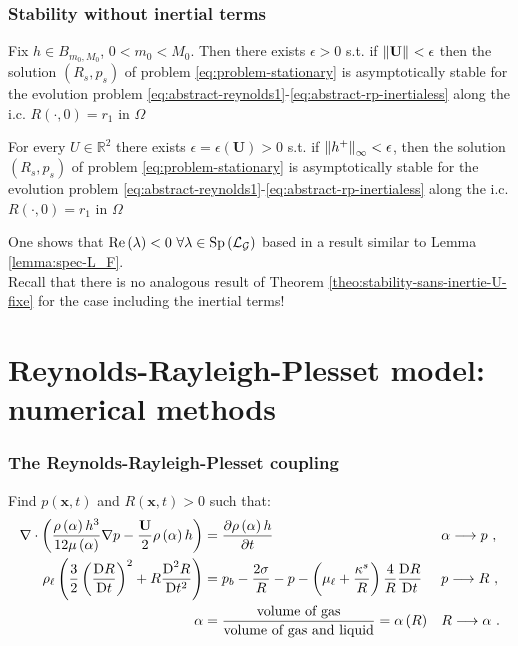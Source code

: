 \documentclass[10pt,aspectratio=169]{beamer}
\begin{document}
\begin{frame}\frametitle{Stability without inertial terms}
\begin{theorem} \label{theo:stability-sans-inertie-h-fix}
	Fix $h\in B_{m_0,M_0}$, $0<m_0<M_0$. Then there exists $\epsilon>0$ s.t. if $\left\lVert\mathbf{U}\right\rVert_{}<\epsilon$ then the solution $\left(R_s,p_s\right)$ of problem \eqref{eq:problem-stationary} is asymptotically stable for the evolution problem \eqref{eq:abstract-reynolds1}-\eqref{eq:abstract-rp-inertialess} along the i.c. $R\left(\cdot,0\right)=r_1$ in $\Omega$
\end{theorem}
\begin{theorem}\label{theo:stability-sans-inertie-U-fixe} For every $U\in \mathbb{R}^2$ there exists $\epsilon=\epsilon\left(\mathbf{U}\right)>0$ s.t. if $\left\lVert h^+\right\rVert_{\infty}<\epsilon$, then the solution $\left(R_s,p_s\right)$ of problem \eqref{eq:problem-stationary} is asymptotically stable for the evolution problem \eqref{eq:abstract-reynolds1}-\eqref{eq:abstract-rp-inertialess} along the i.c. $R\left(\cdot,0\right)=r_1$ in $\Omega$
\end{theorem}\bigskip

One shows that $\mbox{Re}\left(\lambda\right)<0~\forall \lambda\in \textnormal{Sp}\left(\mathcal{L}_\mathcal{G}\right)$ based in a result similar to Lemma \ref{lemma:spec-L_F}.\\
\bigskip
Recall that there is no analogous result of Theorem \ref{theo:stability-sans-inertie-U-fixe} for the case including the inertial terms!
\end{frame}

\setcounter{showSlideNumbers}{0}
\section{Reynolds-Rayleigh-Plesset model: numerical methods}
\setcounter{showSlideNumbers}{1}

\begin{frame}
\frametitle{The Reynolds-Rayleigh-Plesset coupling}

Find $p(\mathbf{x},t)$ and $R(\mathbf{x},t)>0$ such that:
\begin{align*}
\nabla\cdot\left(\frac{\rho\left(\alpha\right) h^3}{12\mu\left(\alpha\right) }\nabla p-\frac{\mathbf{U}}{2}\rho\left(\alpha\right) h \right)&=\frac{\partial \rho\left(\alpha\right) h}{\partial t}&&\alpha \longrightarrow p~,\\
\rho_\ell\left(\frac{3}{2}\left(\frac{\mbox{D} R}{\mbox{D} t}\right)^2+R\frac{\mbox{D}^2 R}{\mbox{D} {t}^2}\right)&=p_b-\frac{2\sigma}{R}-p-\left(\mu_\ell+\frac{\kappa^s}{R}\right)\frac{4}{R}\frac{\mbox{D} R}{\mbox{D} t}&&p\longrightarrow R~,\\
\alpha&=\frac{\mbox{volume of gas}}{\mbox{volume of gas and liquid}}=\alpha\left(R\right)&&R\longrightarrow \alpha~.
\end{align*}
\end{frame} 
\end{document}
